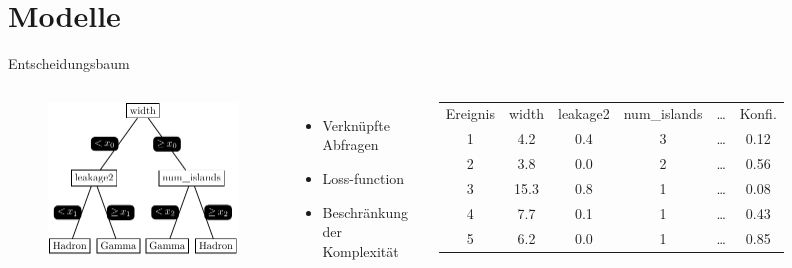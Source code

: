 \documentclass[aspectratio=1610, professionalfonts, 9pt]{beamer}
\begin{document}
\section{Modelle}
\begin{frame}{Entscheidungsbaum}
  \begin{columns}
	\begin{figure}
	  \centering
	  \includegraphics[width=\textwidth]{./tikz/Tree/Tree.pdf}
	\end{figure}
	\begin{itemize}
	  \item Verknüpfte Abfragen 
	  \item Loss-function
	  \item Beschränkung der Komplexität 
	\end{itemize}
	\begin{table}	  
	  \centering
	  \begin{tabular}{c c c c c c}
		\toprule
		Ereignis & width & leakage2 & num\_islands & \dots & Konfi. \\ 
		\cmidrule(r){1-1} 	\cmidrule{2-5} \cmidrule(l){6-6}
		1 & \num{4.2}  & \num{0.4}  & \num{3} & \dots & \num{0.12} \\
		2 & \num{3.8}  & \num{0.0}  & \num{2} & \dots & \num{0.56} \\
		3 & \num{15.3} & \num{0.8} 	& \num{1} & \dots & \num{0.08} \\
		4 & \num{7.7}  & \num{0.1}  & \num{1} & \dots & \num{0.43} \\
		5 & \num{6.2}  & \num{0.0}  & \num{1} & \dots & \num{0.85} \\
		\bottomrule
	  \end{tabular}
	\end{table}
  \end{columns}
\end{frame}
\end{document}
